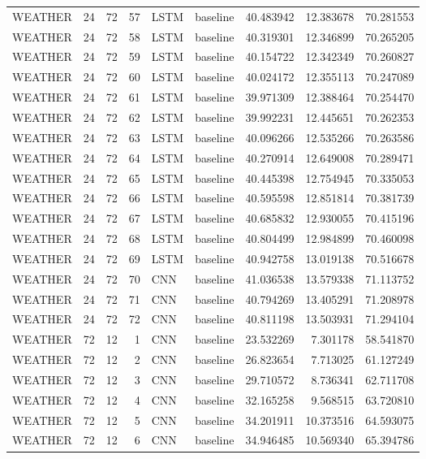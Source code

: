 \begin{table}
\begin{tabular}{lrrrllrrr}
WEATHER & 24 & 72 & 57 & LSTM & baseline & 40.483942 & 12.383678 & 70.281553 \\
WEATHER & 24 & 72 & 58 & LSTM & baseline & 40.319301 & 12.346899 & 70.265205 \\
WEATHER & 24 & 72 & 59 & LSTM & baseline & 40.154722 & 12.342349 & 70.260827 \\
WEATHER & 24 & 72 & 60 & LSTM & baseline & 40.024172 & 12.355113 & 70.247089 \\
WEATHER & 24 & 72 & 61 & LSTM & baseline & 39.971309 & 12.388464 & 70.254470 \\
WEATHER & 24 & 72 & 62 & LSTM & baseline & 39.992231 & 12.445651 & 70.262353 \\
WEATHER & 24 & 72 & 63 & LSTM & baseline & 40.096266 & 12.535266 & 70.263586 \\
WEATHER & 24 & 72 & 64 & LSTM & baseline & 40.270914 & 12.649008 & 70.289471 \\
WEATHER & 24 & 72 & 65 & LSTM & baseline & 40.445398 & 12.754945 & 70.335053 \\
WEATHER & 24 & 72 & 66 & LSTM & baseline & 40.595598 & 12.851814 & 70.381739 \\
WEATHER & 24 & 72 & 67 & LSTM & baseline & 40.685832 & 12.930055 & 70.415196 \\
WEATHER & 24 & 72 & 68 & LSTM & baseline & 40.804499 & 12.984899 & 70.460098 \\
WEATHER & 24 & 72 & 69 & LSTM & baseline & 40.942758 & 13.019138 & 70.516678 \\
WEATHER & 24 & 72 & 70 & CNN & baseline & 41.036538 & 13.579338 & 71.113752 \\
WEATHER & 24 & 72 & 71 & CNN & baseline & 40.794269 & 13.405291 & 71.208978 \\
WEATHER & 24 & 72 & 72 & CNN & baseline & 40.811198 & 13.503931 & 71.294104 \\
WEATHER & 72 & 12 & 1 & CNN & baseline & 23.532269 & 7.301178 & 58.541870 \\
WEATHER & 72 & 12 & 2 & CNN & baseline & 26.823654 & 7.713025 & 61.127249 \\
WEATHER & 72 & 12 & 3 & CNN & baseline & 29.710572 & 8.736341 & 62.711708 \\
WEATHER & 72 & 12 & 4 & CNN & baseline & 32.165258 & 9.568515 & 63.720810 \\
WEATHER & 72 & 12 & 5 & CNN & baseline & 34.201911 & 10.373516 & 64.593075 \\
WEATHER & 72 & 12 & 6 & CNN & baseline & 34.946485 & 10.569340 & 65.394786 \\

\end{tabular}
\end{table}
